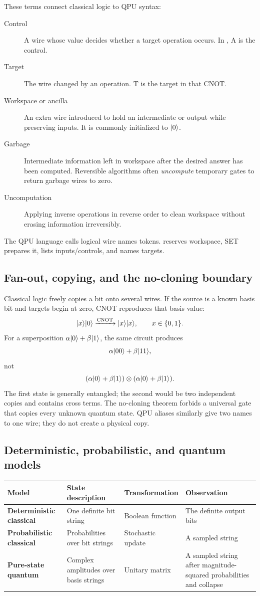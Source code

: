 These terms connect classical logic to QPU syntax:
\begin{description}
  \item[Control] A wire whose value decides whether a target operation occurs.
  In , A is the control.
  \item[Target] The wire changed by an operation. T is the target in that CNOT.
  \item[Workspace or ancilla] An extra wire introduced to hold an intermediate
  or output while preserving inputs. It is commonly initialized to $\lvert 0\rangle$.
  \item[Garbage] Intermediate information left in workspace after the desired
  answer has been computed. Reversible algorithms often \emph{uncompute}
  temporary gates to return garbage wires to zero.
  \item[Uncomputation] Applying inverse operations in reverse order to clean
  workspace without erasing information irreversibly.
\end{description}

The QPU language calls logical wire names tokens.  reserves
workspace, SET prepares it,  lists inputs/controls, and 
names targets.

\subsection{Fan-out, copying, and the no-cloning boundary}

Classical logic freely copies a bit onto several wires. If the source is a
known basis bit and targets begin at zero, CNOT reproduces that basis value:
\[
\lvert x\rangle\lvert 0\rangle\xrightarrow{\mathrm{CNOT}}\lvert x\rangle\lvert x\rangle,
\qquad x\in\{0,1\}.
\]
For a superposition $\alpha\lvert 0\rangle+\beta\lvert 1\rangle$, the same circuit produces
\[
\alpha\lvert 00\rangle+\beta\lvert 11\rangle,
\]
not
\[
(\alpha\lvert 0\rangle+\beta\lvert 1\rangle)\otimes
(\alpha\lvert 0\rangle+\beta\lvert 1\rangle).
\]
The first state is generally entangled; the second would be two independent
copies and contains cross terms. The no-cloning theorem forbids a universal
gate that copies every unknown quantum state. QPU aliases similarly give two
names to one wire; they do not create a physical copy.

\subsection{Deterministic, probabilistic, and quantum models}

\begin{tabularx}{\textwidth}{>{\bfseries}p{}XXX}
\toprule
Model & State description & Transformation & Observation\\
\midrule
Deterministic classical & One definite bit string & Boolean function &
The definite output bits\\
Probabilistic classical & Probabilities over bit strings & Stochastic update &
A sampled string\\
Pure-state quantum & Complex amplitudes over basis strings & Unitary matrix &
A sampled string after magnitude-squared probabilities and collapse\\
\bottomrule
\end{tabularx}

